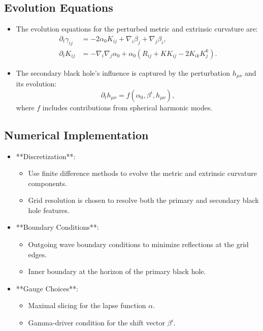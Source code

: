 \documentclass[12pt]{article}
\begin{document}
\subsection{Evolution Equations}
\begin{itemize}
    \item The evolution equations for the perturbed metric and extrinsic curvature are:
    \begin{align*}
        \partial_t \gamma_{ij} &= -2\alpha_0 K_{ij} + \nabla_i \beta_j + \nabla_j \beta_i, \\
        \partial_t K_{ij} &= -\nabla_i \nabla_j \alpha_0 + \alpha_0 \left( R_{ij} + K K_{ij} - 2K_{ik} K^k_j \right).
    \end{align*}
    \item The secondary black hole's influence is captured by the perturbation $h_{\mu\nu}$ and its evolution:
    \[
    \partial_t h_{\mu\nu} = f(\alpha_0, \beta^i, h_{\mu\nu}),
    \]
    where $f$ includes contributions from spherical harmonic modes.
\end{itemize}

\subsection{Numerical Implementation}
\begin{itemize}
    \item **Discretization**:
    \begin{itemize}
        \item Use finite difference methods to evolve the metric and extrinsic curvature components.
        \item Grid resolution is chosen to resolve both the primary and secondary black hole features.
    \end{itemize}
    \item **Boundary Conditions**:
    \begin{itemize}
        \item Outgoing wave boundary conditions to minimize reflections at the grid edges.
        \item Inner boundary at the horizon of the primary black hole.
    \end{itemize}
    \item **Gauge Choices**:
    \begin{itemize}
        \item Maximal slicing for the lapse function $\alpha$.
        \item Gamma-driver condition for the shift vector $\beta^i$.
    \end{itemize}
\end{itemize}
\end{document}
